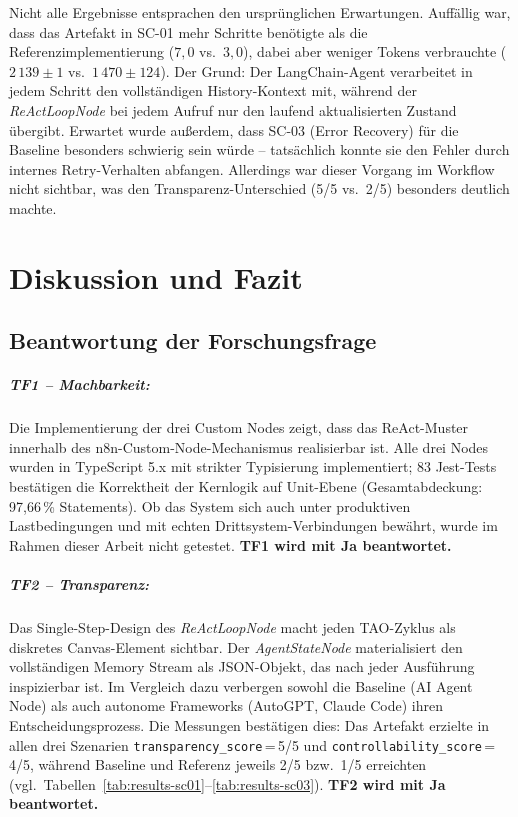 \documentclass[12pt,a4paper,oneside]{report}
\begin{document}
Nicht alle Ergebnisse entsprachen den ursprünglichen Erwartungen. Auffällig war, dass
das Artefakt in SC-01 mehr Schritte benötigte als die Referenzimplementierung
($7{,}0$ vs.\ $3{,}0$), dabei aber weniger Tokens verbrauchte
($2\,139 \pm 1$ vs.\ $1\,470 \pm 124$). Der Grund: Der LangChain-Agent verarbeitet
in jedem Schritt den vollständigen History-Kontext mit, während der
\textit{ReActLoopNode} bei jedem Aufruf nur den laufend aktualisierten Zustand
übergibt. Erwartet wurde außerdem, dass SC-03 (Error Recovery) für die Baseline
besonders schwierig sein würde -- tatsächlich konnte sie den Fehler durch internes
Retry-Verhalten abfangen. Allerdings war dieser Vorgang im Workflow nicht sichtbar,
was den Transparenz-Unterschied (5/5 vs.\ 2/5) besonders deutlich machte.

\chapter{Diskussion und Fazit}

\section{Beantwortung der Forschungsfrage}

\paragraph{TF1 -- Machbarkeit:}
Die Implementierung der drei Custom Nodes zeigt, dass das ReAct-Muster innerhalb des
n8n-Custom-Node-Mechanismus realisierbar ist. Alle drei Nodes wurden in TypeScript 5.x
mit strikter Typisierung implementiert; 83 Jest-Tests bestätigen die Korrektheit der
Kernlogik auf Unit-Ebene (Gesamtabdeckung: 97,66\,\% Statements). Ob das System sich
auch unter produktiven Lastbedingungen und mit echten Drittsystem-Verbindungen bewährt,
wurde im Rahmen dieser Arbeit nicht getestet. \textbf{TF1 wird mit Ja beantwortet.}

\paragraph{TF2 -- Transparenz:}
Das Single-Step-Design des \textit{ReActLoopNode} macht jeden \ac{TAO}-Zyklus als
diskretes Canvas-Element sichtbar. Der \textit{AgentStateNode} materialisiert den
vollständigen Memory Stream als \ac{JSON}-Objekt, das nach jeder Ausführung
inspizierbar ist. Im Vergleich dazu verbergen sowohl die Baseline (AI Agent Node)
als auch autonome Frameworks (AutoGPT, Claude Code) ihren Entscheidungsprozess.
Die Messungen bestätigen dies: Das Artefakt erzielte in allen drei Szenarien
\texttt{transparency\_score}\,=\,5/5 und \texttt{controllability\_score}\,=\,4/5,
während Baseline und Referenz jeweils 2/5 bzw.\ 1/5 erreichten (vgl.\
Tabellen~\ref{tab:results-sc01}--\ref{tab:results-sc03}).
\textbf{TF2 wird mit Ja beantwortet.}
\end{document}
